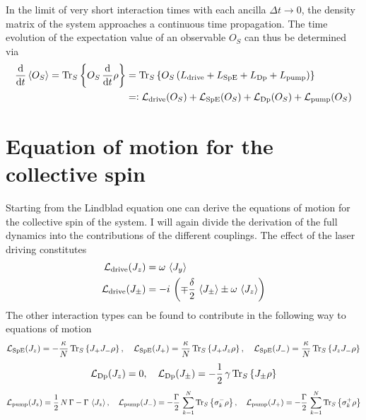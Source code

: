 In the limit of very short interaction times with each ancilla $\Delta t\rightarrow0$, the density matrix of the system approaches a continuous time propagation. The time evolution of the expectation value of an observable $O_S$ can thus be determined via 
\begin{align}
    \frac{\text{d}}{\text{d}t} \braket{O_S}=\text{Tr}_S\left\{O_S\,\frac{\text{d}}{\text{d}t}\rho\right\}&=\text{Tr}_S\left\{O_S\,(L_\text{drive}+L_\text{SpE}+L_\text{Dp}+L_\text{pump})\right\}\notag\\
    &=\vcentcolon \mathcal{L}_\text{drive}(O_S)+\mathcal{L}_\text{SpE}(O_S)+\mathcal{L}_\text{Dp}(O_S)+\mathcal{L}_\text{pump}(O_S)
\end{align}

\section[mean field equations]{Equation of motion for the collective spin}
Starting from the Lindblad equation one can derive the equations of motion for the collective spin of the system. I will again divide the derivation of the full dynamics into the contributions of the different couplings. The effect of the laser driving constitutes 
\begin{align*}
    \mathcal{L}_\text{drive}(J_z)&=\omega\,\braket{J_y}\\
    \mathcal{L}_\text{drive}(J_\pm)&=-i\,\left(\mp\frac{\delta}{2}\, \braket{J_\pm} \pm \omega\, \braket{J_z}\right)
\end{align*}
The other interaction types can be found to contribute in the following way to equations of motion
\begin{align*}
    \mathcal{L}_\text{SpE}(J_z)=-\frac{\kappa}{N}\,\text{Tr}_S\left\{J_+ J_- \rho\right\},\quad
    \mathcal{L}_\text{SpE}(J_+)=\frac{\kappa}{N}\,\text{Tr}_S\left\{J_+ J_z \rho\right\},\quad
    \mathcal{L}_\text{SpE}(J_-)=\frac{\kappa}{N}\,\text{Tr}_S\left\{J_z J_- \rho\right\}
\end{align*}
\begin{align}
    \mathcal{L}_\text{Dp}(J_z)=0,\quad
    \mathcal{L}_\text{Dp}(J_\pm)=-\frac{1}{2}\,\gamma\,\text{Tr}_S\left\{J_\pm\rho\right\}
\end{align}
\begin{align*}
    \mathcal{L}_\text{pump}(J_z)=\frac{1}{2}\,N\,\Gamma-\Gamma\,\braket{J_z},\quad
    \mathcal{L}_\text{pump}(J_-)=-\frac{\Gamma}{2}\,\sum_{k=1}^N\text{Tr}_S\left\{\sigma_k^-\rho\right\},\quad
    \mathcal{L}_\text{pump}(J_+)=-\frac{\Gamma}{2}\,\sum_{k=1}^N\text{Tr}_S\left\{\sigma_k^+\rho\right\}
\end{align*}
